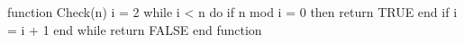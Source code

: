 function Check(n)
  i = 2
  while i < n do
    if n mod i = 0 then
      return TRUE
    end if
    i = i + 1
  end while
  return FALSE
end function
